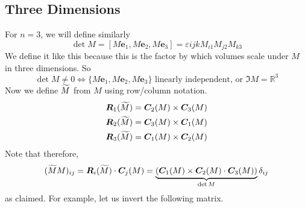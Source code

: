 \documentclass{article}
\begin{document}
\subsection{Three Dimensions}
For $n=3$, we will define similarly
\[ \det M = [M\bm e_1, M\bm e_2, M\bm e_3] = \varepsilon{ijk}M_{i1}M_{j2}M_{k3} \]
We define it like this because this is the factor by which volumes scale under $M$ in three dimensions. So
\[ \det M \neq 0 \iff \{ M \bm e_1, M \bm e_2, M \bm e_3 \} \text{ linearly independent, or } \Im M = \mathbb R^3 \]
Now we define $\widetilde{M}$ from $M$ using row/column notation.
\begin{align*}
	\bm R_1(\widetilde{M}) & = \bm C_2(M) \times \bm C_3(M) \\
	\bm R_2(\widetilde{M}) & = \bm C_3(M) \times \bm C_1(M) \\
	\bm R_3(\widetilde{M}) & = \bm C_1(M) \times \bm C_2(M)
\end{align*}
Note that therefore,
\[ (\widetilde{M} M)_{ij} = \bm R_i(\widetilde{M}) \cdot \bm C_j(M) = \underbrace{(\bm C_1(M) \times \bm C_2(M) \cdot \bm C_3(M))}_{\det M}\delta_{ij} \]
as claimed. For example, let us invert the following matrix.
\end{document}

